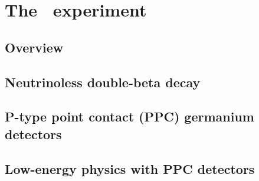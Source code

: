 
\chapter{The \MJ\ experiment}

	\section{Overview}

	\section{Neutrinoless double-beta decay}
	
	\section{P-type point contact (PPC) germanium detectors}

	\section{Low-energy physics with PPC detectors}
